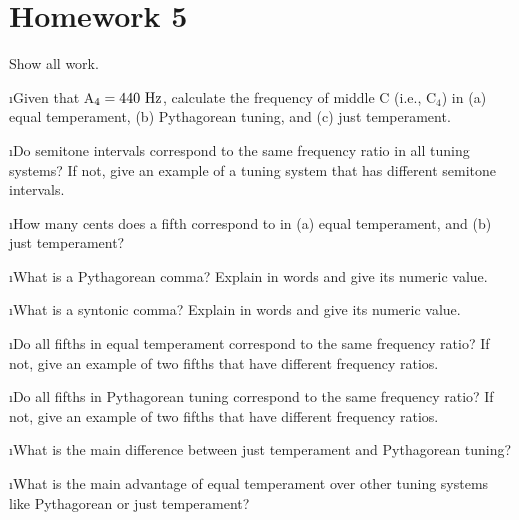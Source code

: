 \section{Homework 5}

\noindent
Show all work.

\ben

\i Given that A$_4=440~{\rm Hz}$, calculate
the frequency of middle C (i.e., C$_4$) in
(a) equal temperament,
(b) Pythagorean tuning, and
(c) just temperament.

\i Do semitone intervals correspond to the
same frequency ratio in all tuning systems?
If not, give an example of a tuning system
that has different semitone intervals.

\i How many cents does a fifth 
correspond to in 
(a) equal temperament, and
(b) just temperament?

\i What is a Pythagorean comma?
Explain in words and give its numeric value.

\i What is a syntonic comma?
Explain in words and give its numeric value.

\i Do all fifths in equal temperament correspond
to the same frequency ratio?
If not, give an example of two fifths that have
different frequency ratios.

\i Do all fifths in Pythagorean tuning correspond
to the same frequency ratio?
If not, give an example of two fifths that have
different frequency ratios.

\i What is the main difference between just temperament 
and Pythagorean tuning?

\i What is the main advantage of equal temperament
over other tuning systems like Pythagorean or just 
temperament?

\een

